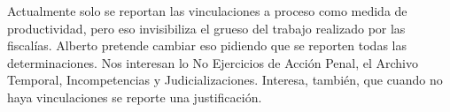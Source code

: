 \documentclass[a4paper,12pt]{article}
\begin{document}
Actualmente solo se reportan las vinculaciones a proceso como medida de productividad, pero eso invisibiliza el grueso del trabajo realizado por las fiscalías.
Alberto pretende cambiar eso pidiendo que se reporten todas las determinaciones.
Nos interesan lo No Ejercicios de Acción Penal, el Archivo Temporal, Incompetencias y Judicializaciones.
Interesa, también, que cuando no haya vinculaciones se reporte una justificación.
\end{document}
